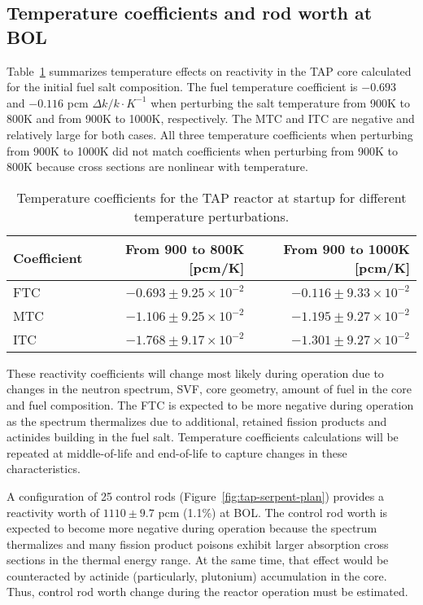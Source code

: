 \subsection{Temperature coefficients and rod worth at BOL}
Table~\ref{tab:tcoef} summarizes temperature effects on reactivity in the 
\gls{TAP} core calculated for the initial fuel salt composition. The fuel 
temperature coefficient is $-0.693$ and $-0.116$ pcm $\Delta k/k\cdot K^{-1}$ 
when perturbing the salt temperature from 900K to 800K and from 900K to 1000K, 
respectively. The MTC and ITC are negative and relatively large for both 
cases. All three temperature coefficients when perturbing from 900K to 
1000K did not match coefficients when perturbing from 900K to 800K because 
cross sections are nonlinear with temperature.

\begin{table}[ht!]
	\caption{Temperature coefficients for the \gls{TAP} reactor at startup for 
	different temperature perturbations.}
	\begin{tabularx}{\textwidth}{ X  r r } \hline
		\textbf{Coefficient} & \textbf{From 900 to 800K [pcm/K]} & 
		\textbf{From 900 to 1000K [pcm/K]}                  \tabularnewline 
		[5pt] \hline
		FTC & $-0.693\pm9.25\times10^{-2}$ & $-0.116\pm9.33\times10^{-2}$ 
		\tabularnewline [3pt] \hline
		MTC & $-1.106\pm9.25\times10^{-2}$ & $-1.195\pm9.27\times10^{-2}$  
		\tabularnewline [3pt] \hline
		ITC  & $-1.768\pm9.17\times10^{-2}$ &  $-1.301\pm9.27\times10^{-2}$  
		\tabularnewline [3pt] \hline
	\end{tabularx}
	\label{tab:tcoef}
\end{table}
These reactivity coefficients will change most likely during operation due to 
changes in the neutron spectrum, \gls{SVF}, core geometry, amount of fuel in 
the core and fuel composition. The FTC is expected to be more negative 
during operation as the spectrum thermalizes due to additional, retained  
fission products and actinides building in the fuel salt. Temperature 
coefficients calculations will be repeated at middle-of-life and end-of-life 
to capture changes in these characteristics.

A configuration of 25 control rods (Figure~\ref{fig:tap-serpent-plan}) 
provides a reactivity worth of $1110\pm9.7$ pcm (1.1\%) at \gls{BOL}. The 
control rod worth is expected to become more negative during operation 
because the spectrum thermalizes and many fission product poisons exhibit 
larger absorption cross sections in the thermal energy range. At the same 
time, that effect would be counteracted by actinide (particularly, plutonium) 
accumulation in the core. Thus, control rod worth change during the reactor 
operation must be estimated.
